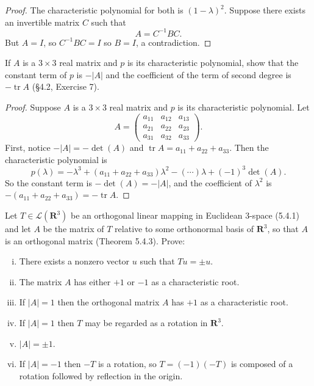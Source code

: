 \begin{proof}   
    The characteristic polynomial for both is $(1 - \lambda)^2$.
    Suppose there exists an invertible matrix $C$ such that 
    \[A = C^{-1} B C.\]
    But $A = I$, so $C^{-1}BC = I$ so $B = I$, a contradiction. 
\end{proof}

\begin{tcolorbox}[title=Problem 7, breakable]
If $A$ is a $3 \times 3$ real matrix and $p$ 
is its characteristic polynomial,
show that the constant term of $p$ is $-|A|$ 
and the coefficient of the term of second degree is $-\operatorname{tr} A$ 
(\S4.2, Exercise 7).
\end{tcolorbox}

\begin{proof}
Suppose $A$ is a $3\times 3$ real matrix and $p$ is its characteristic polynomial. Let
\[
A = \begin{pmatrix} a_{11} & a_{12} & a_{13}\\ a_{21} & a_{22} & a_{23}\\ a_{31} & a_{32} & a_{33} \end{pmatrix}.
\]
First, notice $-|A| = -\det(A)$ and $\operatorname{tr} A = a_{11}+a_{22}+a_{33}$. Then the characteristic polynomial is
\[
p(\lambda) = -\lambda^3 + (a_{11}+a_{22}+a_{33})\lambda^2 - (\cdots)\lambda + (-1)^3\det(A).
\]
So the constant term is $-\det(A) = -|A|$, and the coefficient of $\lambda^2$ is $-(a_{11}+a_{22}+a_{33}) = -\operatorname{tr} A$.
\end{proof}


\begin{tcolorbox}[title=Problem 8, breakable]
Let $T \in \mathcal{L}(\mathbf{R}^3)$ be an orthogonal linear mapping in Euclidean 3-space (5.4.1) and let $A$ be the matrix of $T$ relative to some orthonormal basis of $\mathbf{R}^3$, so that $A$ is an orthogonal matrix (Theorem 5.4.3). Prove:
\begin{enumerate}[(i)]
    \item There exists a nonzero vector $u$ such that $Tu = \pm u$.
    \item The matrix $A$ has either $+1$ or $-1$ as a characteristic root.
    \item If $|A| = 1$ then the orthogonal matrix $A$ has $+1$ as a characteristic root.
    \item If $|A| = 1$ then $T$ may be regarded as a rotation in $\mathbf{R}^3$.
    \item $|A| = \pm 1$.
    \item If $|A| = -1$ then $-T$ is a rotation, so $T = (-1)(-T)$ is composed of a rotation followed by reflection in the origin.
\end{enumerate}
\end{tcolorbox}

